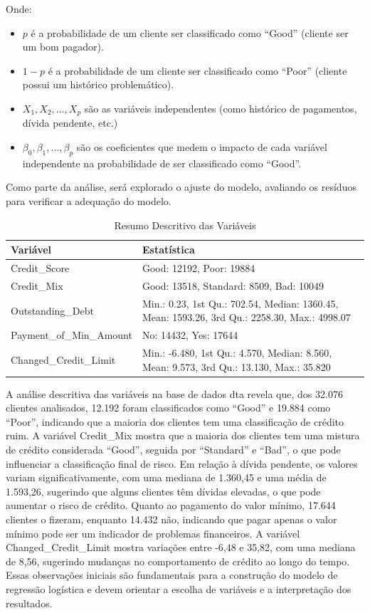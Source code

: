\documentclass[
  letterpaper,
  DIV=11,
  numbers=noendperiod]{scrreprt}
\begin{document}
Onde:

\begin{itemize}
\item
  \(p\) é a probabilidade de um cliente ser classificado como ``Good''
  (cliente ser um bom pagador).
\item
  \(1-p\) é a probabilidade de um cliente ser classificado como ``Poor''
  (cliente possui um histórico problemático).
\item
  \(X_1, X_2, ..., X_p\) são as variáveis independentes (como histórico
  de pagamentos, dívida pendente, etc.)
\item
  \(\beta_0, \beta_1, ..., \beta_p\) são os coeficientes que medem o
  impacto de cada variável independente na probabilidade de ser
  classificado como ``Good''.
\end{itemize}

Como parte da análise, será explorado o ajuste do modelo, avaliando os
resíduos para verificar a adequação do modelo.

\begin{longtable}[t]{l>{\raggedright\arraybackslash}p{17em}}
\caption{\label{tab:unnamed-chunk-30}Resumo Descritivo das Variáveis}\\
\toprule
Variável & Estatística\\
\midrule
Credit\_Score & Good: 12192, Poor: 19884\\
Credit\_Mix & Good: 13518, Standard: 8509, Bad: 10049\\
Outstanding\_Debt & Min.: 0.23, 1st Qu.: 702.54, Median: 1360.45, Mean: 1593.26, 3rd Qu.: 2258.30, Max.: 4998.07\\
Payment\_of\_Min\_Amount & No: 14432, Yes: 17644\\
Changed\_Credit\_Limit & Min.: -6.480, 1st Qu.: 4.570, Median: 8.560, Mean: 9.573, 3rd Qu.: 13.130, Max.: 35.820\\
\bottomrule
\end{longtable}

A análise descritiva das variáveis na base de dados dta revela que, dos
32.076 clientes analisados, 12.192 foram classificados como ``Good'' e
19.884 como ``Poor'', indicando que a maioria dos clientes tem uma
classificação de crédito ruim. A variável Credit\_Mix mostra que a
maioria dos clientes tem uma mistura de crédito considerada ``Good'',
seguida por ``Standard'' e ``Bad'', o que pode influenciar a
classificação final de risco. Em relação à dívida pendente, os valores
variam significativamente, com uma mediana de 1.360,45 e uma média de
1.593,26, sugerindo que alguns clientes têm dívidas elevadas, o que pode
aumentar o risco de crédito. Quanto ao pagamento do valor mínimo, 17.644
clientes o fizeram, enquanto 14.432 não, indicando que pagar apenas o
valor mínimo pode ser um indicador de problemas financeiros. A variável
Changed\_Credit\_Limit mostra variações entre -6,48 e 35,82, com uma
mediana de 8,56, sugerindo mudanças no comportamento de crédito ao longo
do tempo. Essas observações iniciais são fundamentais para a construção
do modelo de regressão logística e devem orientar a escolha de variáveis
e a interpretação dos resultados.
\end{document}
